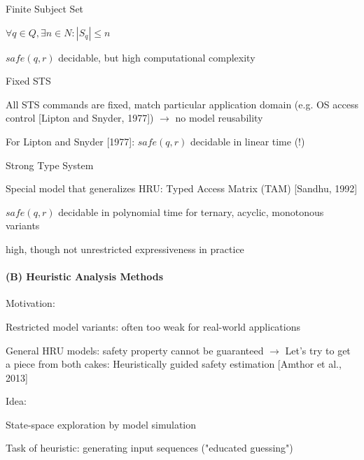 \documentclass[a4paper]{article}
\begin{document}
\begin{multicols}{3}
    Finite Subject Set
    \begin{itemize*}
        \item $\forall q\in Q,\exists n\in N: |S_q|\leq n$
        \item $safe(q,r)$ decidable, but high computational complexity
    \end{itemize*}

    Fixed STS
    \begin{itemize*}
        \item All STS commands are fixed, match particular application domain (e.g. OS access control [Lipton and Snyder, 1977]) $\rightarrow$  no model reusability
        \item For Lipton and Snyder [1977]: $safe(q,r)$ decidable in linear time (!)
    \end{itemize*}

    Strong Type System
    \begin{itemize*}
        \item Special model that generalizes HRU: Typed Access Matrix (TAM) [Sandhu, 1992]
        \item $safe(q,r)$ decidable in polynomial time for ternary, acyclic, monotonous variants
        \item high, though not unrestricted expressiveness in practice
    \end{itemize*}

    \paragraph{(B) Heuristic Analysis Methods}
    Motivation:
    \begin{itemize*}
        \item Restricted model variants: often too weak for real-world applications
        \item General HRU models: safety property cannot be guaranteed $\rightarrow$ Let’s try to get a piece from both cakes: Heuristically guided safety estimation [Amthor et al., 2013]
    \end{itemize*}

    Idea:
    \begin{itemize*}
        \item State-space exploration by model simulation
        \item Task of heuristic: generating input sequences ("educated guessing")
    \end{itemize*}


\end{multicols}
\end{document}
